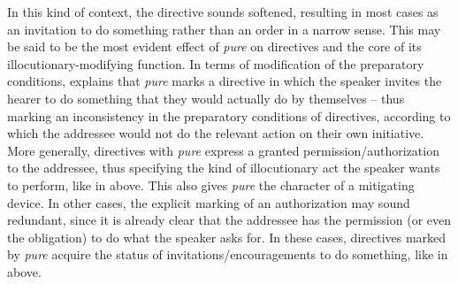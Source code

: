In this kind of context, the directive sounds softened, resulting in most cases as an invitation to do something rather than an order in a narrow sense. This may be said to be the most evident effect of \textit{pure} on directives and the core of its illocutionary-modifying function. In terms of modification of the preparatory conditions, \citet[107–108]{Waltereit2006} explains that \textit{pure} marks a directive in which the speaker invites the hearer to do something that they would actually do by themselves – thus marking an inconsistency in the preparatory conditions of directives, according to which the addressee would not do the relevant action on their own initiative. More generally, directives with \textit{pure} express a granted permission/authorization to the addressee, thus specifying the kind of illocutionary act the speaker wants to perform, like in  above. This also gives \textit{pure} the character of a mitigating device. In other cases, the explicit marking of an authorization may sound redundant, since it is already clear that the addressee has the permission (or even the obligation) to do what the speaker asks for. In these cases, directives marked by \textit{pure} acquire the status of invitations/encouragements to do something, like in  above.


